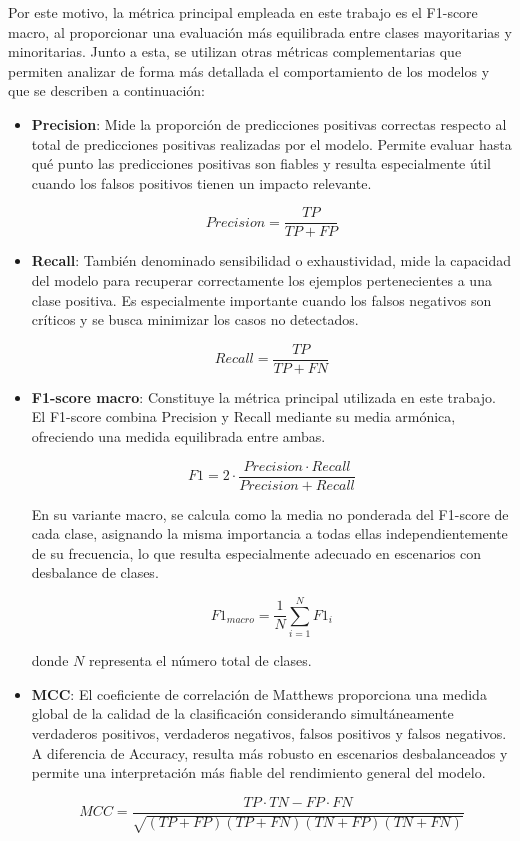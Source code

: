 Por este motivo, la métrica principal empleada en este trabajo es el F1-score macro, al proporcionar una evaluación más equilibrada entre clases mayoritarias y minoritarias. Junto a esta, se utilizan otras métricas complementarias que permiten analizar de forma más detallada el comportamiento de los modelos y que se describen a continuación:


\begin{itemize}
	
	\item \textbf{Precision}: Mide la proporción de predicciones positivas correctas respecto al total de predicciones positivas realizadas por el modelo. Permite evaluar hasta qué punto las predicciones positivas son fiables y resulta especialmente útil cuando los falsos positivos tienen un impacto relevante.
	
	\[
	Precision = \frac{TP}{TP + FP}
	\]
	
	\item \textbf{Recall}: También denominado sensibilidad o exhaustividad, mide la capacidad del modelo para recuperar correctamente los ejemplos pertenecientes a una clase positiva. Es especialmente importante cuando los falsos negativos son críticos y se busca minimizar los casos no detectados.
	
	\[
	Recall = \frac{TP}{TP + FN}
	\]
	
	\item \textbf{F1-score macro}: Constituye la métrica principal utilizada en este trabajo. El F1-score \cite{sokolova_systematic_2009} combina Precision y Recall mediante su media armónica, ofreciendo una medida equilibrada entre ambas.
	
	\[
	F1 = 2 \cdot \frac{Precision \cdot Recall}{Precision + Recall}
	\]
	
	En su variante macro, se calcula como la media no ponderada del F1-score de cada clase, asignando la misma importancia a todas ellas independientemente de su frecuencia, lo que resulta especialmente adecuado en escenarios con desbalance de clases.
	
	\[
	F1_{macro} = \frac{1}{N} \sum_{i=1}^{N} F1_i
	\]
	
	donde \(N\) representa el número total de clases.
	
	\item \textbf{\ac{MCC}}: El coeficiente de correlación de Matthews \cite{matthews_comparison_1975} proporciona una medida global de la calidad de la clasificación considerando simultáneamente verdaderos positivos, verdaderos negativos, falsos positivos y falsos negativos. A diferencia de Accuracy, resulta más robusto en escenarios desbalanceados y permite una interpretación más fiable del rendimiento general del modelo.
	
	\[
	MCC =
	\frac{TP \cdot TN - FP \cdot FN}
	{\sqrt{(TP + FP)(TP + FN)(TN + FP)(TN + FN)}}
	\]
	
\end{itemize}

